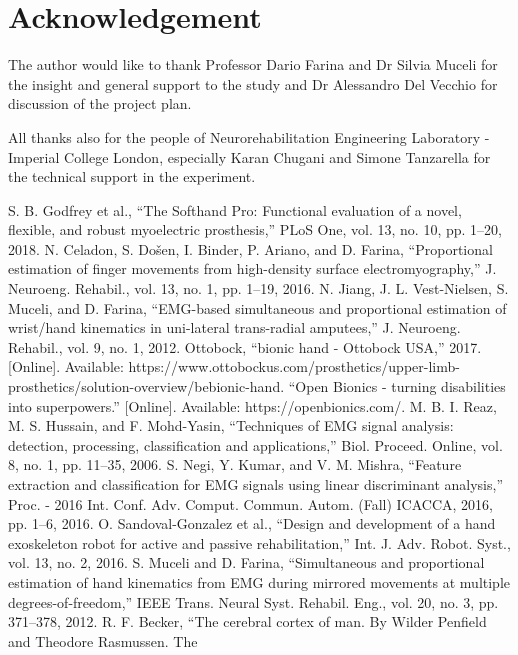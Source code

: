 \documentclass[conference]{IEEEtran}
\begin{document}
\section*{Acknowledgement}
The author would like to thank Professor Dario Farina and Dr Silvia Muceli for the insight and general support to the study and Dr Alessandro Del Vecchio for discussion of the project plan.

All thanks also for the people of Neurorehabilitation Engineering Laboratory - Imperial College London, especially Karan Chugani and Simone Tanzarella for the technical support in the experiment.


\begin{thebibliography}{00}
 S. B. Godfrey et al., “The Softhand Pro: Functional evaluation of a novel, flexible, and robust myoelectric prosthesis,” PLoS One, vol. 13, no. 10, pp. 1–20, 2018.
 N. Celadon, S. Došen, I. Binder, P. Ariano, and D. Farina, “Proportional estimation of finger movements from high-density surface electromyography,” J. Neuroeng. Rehabil., vol. 13, no. 1, pp. 1–19, 2016.
 N. Jiang, J. L. Vest-Nielsen, S. Muceli, and D. Farina, “EMG-based simultaneous and proportional estimation of wrist/hand kinematics in uni-lateral trans-radial amputees,” J. Neuroeng. Rehabil., vol. 9, no. 1, 2012.
 Ottobock, “bionic hand - Ottobock USA,” 2017. [Online]. Available: https://www.ottobockus.com/prosthetics/upper-limb-prosthetics/solution-overview/bebionic-hand.
 “Open Bionics - turning disabilities into superpowers.” [Online]. Available: https://openbionics.com/.
 M. B. I. Reaz, M. S. Hussain, and F. Mohd-Yasin, “Techniques of EMG signal analysis: detection, processing, classification and applications,” Biol. Proceed. Online, vol. 8, no. 1, pp. 11–35, 2006.
 S. Negi, Y. Kumar, and V. M. Mishra, “Feature extraction and classification for EMG signals using 
linear discriminant analysis,” Proc. - 2016 Int. Conf. Adv. Comput. Commun. Autom. (Fall) ICACCA,
2016, pp. 1–6, 2016.
 O. Sandoval-Gonzalez et al., “Design and development of a hand exoskeleton robot for active and 
passive rehabilitation,” Int. J. Adv. Robot. Syst., vol. 13, no. 2, 2016.
 S. Muceli and D. Farina, “Simultaneous and proportional estimation of hand kinematics from EMG 
during mirrored movements at multiple degrees-of-freedom,” IEEE Trans. Neural Syst. Rehabil. 
Eng., vol. 20, no. 3, pp. 371–378, 2012.
 R. F. Becker, “The cerebral cortex of man. By Wilder Penfield and Theodore Rasmussen. The 

\end{thebibliography}
\end{document}

